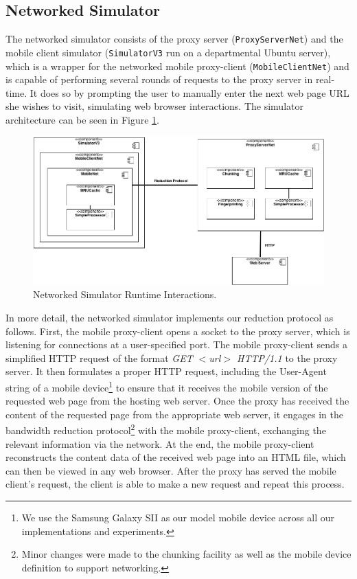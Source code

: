 \subsection{Networked Simulator}
\label{sec:netsim}
The networked simulator consists of the proxy server (\texttt{ProxyServerNet}) and the mobile client simulator (\texttt{SimulatorV3} run on a departmental Ubuntu server), which is a wrapper for the networked mobile proxy-client (\texttt{MobileClientNet}) and is capable of performing several rounds of requests to the proxy server in real-time. It does so by prompting the user to manually enter the next web page URL she wishes to visit, simulating web browser interactions. The simulator architecture can be seen in Figure \ref{fig:netsim_arch}. 

\begin{figure}[ht]
\centering \includegraphics[width=\columnwidth]{images/component_diagram.png}
\caption{Networked Simulator Runtime Interactions.}
\label{fig:netsim_arch}
\end{figure}

In more detail, the networked simulator implements our reduction protocol as follows. First, the mobile proxy-client opens a socket to the proxy server, which is listening for connections at a user-specified port. The mobile proxy-client sends a simplified HTTP request of the format \emph{GET $<$url$>$ HTTP/1.1} to the proxy server. It then formulates a proper HTTP request, including the User-Agent string of a mobile device\footnote{We use the Samsung Galaxy SII as our model mobile device across all our implementations and experiments.} to ensure that it receives the mobile version of the requested web page from the hosting web server. Once the proxy has received the content of the requested page from the appropriate web server, it engages in the bandwidth reduction protocol\footnote{Minor changes were made to the chunking facility as well as the mobile device definition to support networking.} with the mobile proxy-client, exchanging the relevant information via the network. At the end, the mobile proxy-client reconstructs the content data of the received web page into an HTML file, which can then be viewed in any web browser. After the proxy has served the mobile client's request, the client is able to make a new request and repeat this process.

